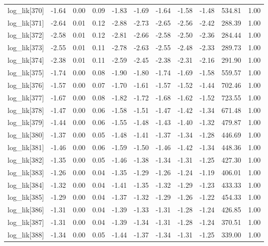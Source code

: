 \begin{table}[ht]
\begin{tabular}{rrrrrrrrrrr}
  log\_lik[370] & -1.64 & 0.00 & 0.09 & -1.83 & -1.69 & -1.64 & -1.58 & -1.48 & 534.81 & 1.00 \\ 
  log\_lik[371] & -2.64 & 0.01 & 0.12 & -2.88 & -2.73 & -2.65 & -2.56 & -2.42 & 288.39 & 1.00 \\ 
  log\_lik[372] & -2.58 & 0.01 & 0.12 & -2.81 & -2.66 & -2.58 & -2.50 & -2.36 & 284.44 & 1.00 \\ 
  log\_lik[373] & -2.55 & 0.01 & 0.11 & -2.78 & -2.63 & -2.55 & -2.48 & -2.33 & 289.73 & 1.00 \\ 
  log\_lik[374] & -2.38 & 0.01 & 0.11 & -2.59 & -2.45 & -2.38 & -2.31 & -2.16 & 291.90 & 1.00 \\ 
  log\_lik[375] & -1.74 & 0.00 & 0.08 & -1.90 & -1.80 & -1.74 & -1.69 & -1.58 & 559.57 & 1.00 \\ 
  log\_lik[376] & -1.57 & 0.00 & 0.07 & -1.70 & -1.61 & -1.57 & -1.52 & -1.44 & 702.46 & 1.00 \\ 
  log\_lik[377] & -1.67 & 0.00 & 0.08 & -1.82 & -1.72 & -1.68 & -1.62 & -1.52 & 723.55 & 1.00 \\ 
  log\_lik[378] & -1.47 & 0.00 & 0.06 & -1.58 & -1.51 & -1.47 & -1.42 & -1.34 & 671.48 & 1.00 \\ 
  log\_lik[379] & -1.44 & 0.00 & 0.06 & -1.55 & -1.48 & -1.43 & -1.40 & -1.32 & 479.87 & 1.00 \\ 
  log\_lik[380] & -1.37 & 0.00 & 0.05 & -1.48 & -1.41 & -1.37 & -1.34 & -1.28 & 446.69 & 1.00 \\ 
  log\_lik[381] & -1.46 & 0.00 & 0.06 & -1.59 & -1.50 & -1.46 & -1.42 & -1.34 & 448.36 & 1.00 \\ 
  log\_lik[382] & -1.35 & 0.00 & 0.05 & -1.46 & -1.38 & -1.34 & -1.31 & -1.25 & 427.30 & 1.00 \\ 
  log\_lik[383] & -1.26 & 0.00 & 0.04 & -1.35 & -1.29 & -1.26 & -1.24 & -1.19 & 406.01 & 1.00 \\ 
  log\_lik[384] & -1.32 & 0.00 & 0.04 & -1.41 & -1.35 & -1.32 & -1.29 & -1.23 & 433.33 & 1.00 \\ 
  log\_lik[385] & -1.29 & 0.00 & 0.04 & -1.37 & -1.32 & -1.29 & -1.26 & -1.22 & 454.33 & 1.00 \\ 
  log\_lik[386] & -1.31 & 0.00 & 0.04 & -1.39 & -1.33 & -1.31 & -1.28 & -1.24 & 426.85 & 1.00 \\ 
  log\_lik[387] & -1.31 & 0.00 & 0.04 & -1.39 & -1.34 & -1.31 & -1.28 & -1.24 & 370.51 & 1.00 \\ 
  log\_lik[388] & -1.34 & 0.00 & 0.05 & -1.44 & -1.37 & -1.34 & -1.31 & -1.25 & 339.00 & 1.00 \\ 

\end{tabular}
\end{table}
